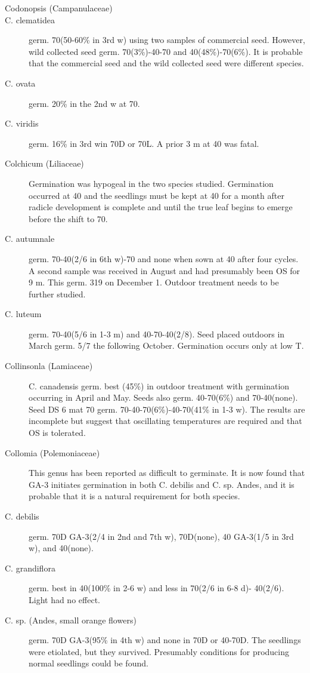 \begin{description}
\item [Codonopsis (Campanulaceae)]
\item [C. clematidea] germ. 70(50-60\% in 3rd w) using two samples of commercial
seed. However, wild collected seed germ. 70(3\%)-40-70 and 40(48\%)-70(6\%). It is
probable that the commercial seed and the wild collected seed were different species.
\item [C. ovata] germ. 20\% in the 2nd w at 70.
\item [C. viridis] germ. 16\% in 3rd win 70D or 70L. A prior 3 m at 40 was fatal.

\item [Colchicum (Liliaceae)] Germination was hypogeal in the two species
studied. Germination occurred at 40 and the seedlings must be kept at 40 for a month
after radicle development is complete and until the true leaf begins to emerge before
the shift to 70.
\item [C. autumnale] germ. 70-40(2/6 in 6th w)-70 and none when sown at 40 after four
cycles. A second sample was received in August and had presumably been OS for 9
m. This germ. 319 on December 1. Outdoor treatment needs to be further studied.
\item [C. luteum] germ. 70-40(5/6 in 1-3 m) and 40-70-40(2/8). Seed placed outdoors
in March germ. 5/7 the following October. Germination occurs only at low T.

\item [Collinsonla (Lamiaceae)] C. canadensis germ. best (45\%) in outdoor
treatment with germination occurring in April and May. Seeds also germ. 40-70(6\%)
and 70-40(none). Seed DS 6 mat 70 germ. 70-40-70(6\%)-40-70(41\% in 1-3 w). The
results are incomplete but suggest that oscillating temperatures are required and that
OS is tolerated.
\item [Collomia (Polemoniaceae)] This genus has been reported as difficult to
germinate. It is now found that GA-3 initiates germination in both C. debilis and C. sp.
Andes, and it is probable that it is a natural requirement for both species.
\item [C. debilis] germ. 70D GA-3(2/4 in 2nd and 7th w), 70D(none), 40 GA-3(1/5 in
3rd w), and 40(none).
\item [C. grandiflora] germ. best in 40(100\% in 2-6 w) and less in 70(2/6 in 6-8 d)-
40(2/6). Light had no effect.
\item [C. sp. (Andes, small orange flowers)] germ. 70D GA-3(95\% in 4th w) and none
in 70D or 40-70D. The seedlings were etiolated, but they survived. Presumably
conditions for producing normal seedlings could be found.


\end{description}
